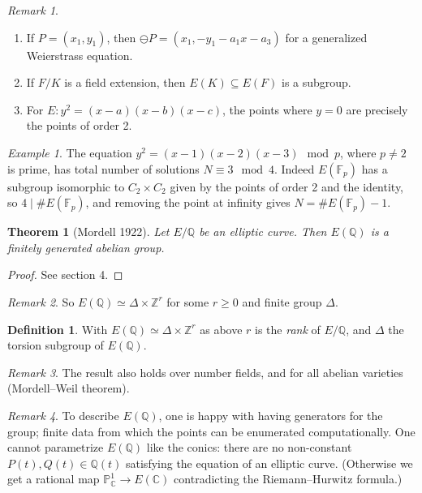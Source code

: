 \documentclass[a4paper]{article}
\theoremstyle{plain}
\newtheorem{theorem}{Theorem}
\theoremstyle{remark}
\newtheorem*{remark}{Remark}
\newtheorem*{example}{Example}
\theoremstyle{definition}
\newtheorem*{definition}{Definition}
\renewcommand{\P}{\mathbb{P}}
\newcommand{\F}{\mathbb{F}}
\newcommand{\Z}{\mathbb{Z}}
\newcommand{\Q}{\mathbb{Q}}
\newcommand{\C}{\mathbb{C}}
\begin{document}
\begin{remark}
    \begin{enumerate}[label=(\roman*)]
        \item If $P=(x_1,y_1)$, then $\ominus P=(x_1,-y_1-a_1x-a_3)$ for a
            generalized Weierstrass equation.

        \item If $F/K$ is a field extension, then $E(K)\subseteq E(F)$ is a
            subgroup.

        \item For $E:y^2=(x-a)(x-b)(x-c)$, the points where $y=0$ are precisely
            the points of order 2.
    \end{enumerate}
\end{remark}

\begin{example}
    The equation $y^2=(x-1)(x-2)(x-3)\mod p$, where $p\ne2$ is prime, has
    total number of solutions $N\equiv3\mod 4$. Indeed $E(\F_p)$ has a subgroup
    isomorphic to $C_2\times C_2$ given by the points of order 2 and the
    identity, so $4\mid\#E(\F_p)$, and removing the point at infinity gives
    $N=\#E(\F_p)-1$.
\end{example}

\begin{theorem}[Mordell 1922]
    Let $E/\Q$ be an elliptic curve. Then $E(\Q)$ is a finitely generated
    abelian group.
\end{theorem}

\begin{proof}
    See section 4.
\end{proof}

\begin{remark}
    So $E(\Q)\simeq\Delta\times\Z^r$ for some $r\ge0$ and finite group $\Delta$.
\end{remark}

\begin{definition}
    With $E(\Q)\simeq\Delta\times\Z^r$ as above $r$ is the \emph{rank} of
    $E/\Q$, and $\Delta$ the torsion subgroup of $E(\Q)$.
\end{definition}

\begin{remark}
    The result also holds over number fields, and for all abelian varieties
    (Mordell--Weil theorem).
\end{remark}

\begin{remark}
    To describe $E(\Q)$, one is happy with having generators for the group;
    finite data from which the points can be enumerated computationally. One
    cannot parametrize $E(\Q)$ like the conics: there are no non-constant
    $P(t),Q(t)\in\Q(t)$ satisfying the equation of an elliptic curve. (Otherwise
    we get a rational map $\P^1_\C\to E(\C)$ contradicting the Riemann--Hurwitz
    formula.)
\end{remark}
\end{document}
